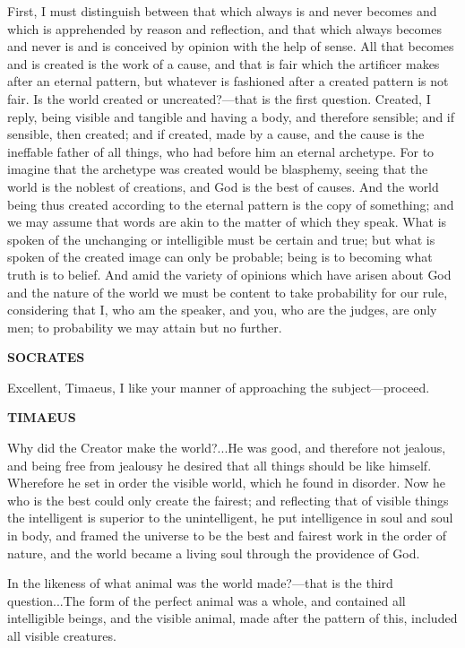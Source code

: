 \documentclass[11pt,letter]{article}
\begin{document}
\par  First, I must distinguish between that which always is and never becomes and which is apprehended by reason and reflection, and that which always becomes and never is and is conceived by opinion with the help of sense. All that becomes and is created is the work of a cause, and that is fair which the artificer makes after an eternal pattern, but whatever is fashioned after a created pattern is not fair. Is the world created or uncreated?—that is the first question. Created, I reply, being visible and tangible and having a body, and therefore sensible; and if sensible, then created; and if created, made by a cause, and the cause is the ineffable father of all things, who had before him an eternal archetype. For to imagine that the archetype was created would be blasphemy, seeing that the world is the noblest of creations, and God is the best of causes. And the world being thus created according to the eternal pattern is the copy of something; and we may assume that words are akin to the matter of which they speak. What is spoken of the unchanging or intelligible must be certain and true; but what is spoken of the created image can only be probable; being is to becoming what truth is to belief. And amid the variety of opinions which have arisen about God and the nature of the world we must be content to take probability for our rule, considering that I, who am the speaker, and you, who are the judges, are only men; to probability we may attain but no further.

\par \textbf{SOCRATES}
\par   Excellent, Timaeus, I like your manner of approaching the subject—proceed.

\par \textbf{TIMAEUS}
\par   Why did the Creator make the world?...He was good, and therefore not jealous, and being free from jealousy he desired that all things should be like himself. Wherefore he set in order the visible world, which he found in disorder. Now he who is the best could only create the fairest; and reflecting that of visible things the intelligent is superior to the unintelligent, he put intelligence in soul and soul in body, and framed the universe to be the best and fairest work in the order of nature, and the world became a living soul through the providence of God.

\par  In the likeness of what animal was the world made?—that is the third question...The form of the perfect animal was a whole, and contained all intelligible beings, and the visible animal, made after the pattern of this, included all visible creatures.
\end{document}
